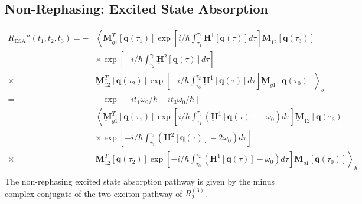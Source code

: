 \documentclass{article}
\newcommand{\bra}[1]{\ensuremath{\left\langle#1\right|}}
\newcommand{\ket}[1]{\ensuremath{\left|#1\right\rangle}}
\newcommand{\vect}[1]{\ensuremath{\boldsymbol{\mathbf{#1}}}}
\newcommand{\arw}{-{Latex[length=2mm]}}
\begin{document}
\subsection{Non-Rephasing: Excited State Absorption}
\begin{figure}[h]
\centering
{}
\end{figure}
\begin{equation}
\begin{split}
 R_\mathrm{ESA}''(t_{1},t_{2},t_{3})=-
&\left\langle\underbar{\vect{M}}_{g1}^{T}[\vect q(\tau_{1})]\exp\left[i/\hbar\int_{\tau_{1}}^{\tau_{3}}\underbar{\vect{H}}^{1}[\vect q(\tau)]d\tau\right] \underbar{\vect{M}}_{12} [\vect q(\tau_{3})]\right.\\
&\times\exp\left[-i/\hbar\int_{\tau_{2}}^{\tau_{3}}\underbar{\vect{H}}^{2}[\vect q(\tau)]d\tau\right]\\
\times&\left.\underbar{\vect{M}}_{12}^{T}[\vect q(\tau_{2})]\exp\left[-i/\hbar\int_{\tau_{0}}^{\tau_{2}}\underbar{\vect{H}}^{1}[\vect q(\tau)]d\tau\right] \underbar{\vect{M}}_{g1} [\vect q(\tau_{0})]\right\rangle_{b}\\
=&-\exp\left[-i t_{1}\omega_{0}/\hbar-it_{3}\omega_{0}/\hbar\right]\\
&\left\langle\underbar{\vect{M}}_{g1}^{T}[\vect q(\tau_{1})]\exp\left[i/\hbar\int_{\tau_{1}}^{\tau_{3}}\left(\underbar{\vect{H}}^{1}[\vect q(\tau)]-\omega_{0}\right)d\tau\right] \underbar{\vect{M}}_{12} [\vect q(\tau_{3})]\right.\\
&\times\exp\left[-i/\hbar\int_{\tau_{2}}^{\tau_{3}}\left(\underbar{\vect{H}}^{2}[\vect q(\tau)]-2\omega_{0}\right)d\tau\right]\\
\times&\left.\underbar{\vect{M}}_{12}^{T}[\vect q(\tau_{2})]\exp\left[-i/\hbar\int_{\tau_{0}}^{\tau_{2}}\left(\underbar{\vect{H}}^{1}[\vect q(\tau)]-\omega_{0}\right)d\tau\right] \underbar{\vect{M}}_{g1} [\vect q(\tau_{0})]\right\rangle_{b}\\
\end{split}
\end{equation}
The non-rephasing excited state absorption pathway is given by the minus complex conjugate of the two-exciton pathway of $R_{2}^{(3)}$.\cite{Hamm2011}
\end{document}
